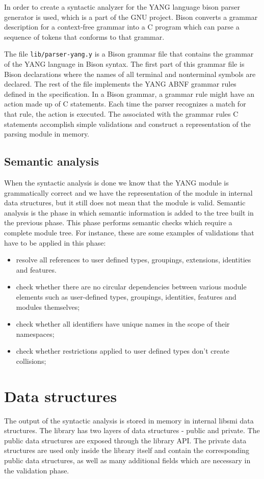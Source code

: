 \documentclass[conference]{IEEEtran}
\begin{document}
In order to create a syntactic analyzer for the YANG language bison parser generator \cite{bib6} is used, which is a part of the GNU project. Bison converts a grammar description for a context-free grammar into a C program which can parse a sequence of tokens that conforms to that grammar. 

The file \texttt{lib/parser-yang.y} is a Bison grammar file that contains the grammar of the YANG language in Bison syntax. The first part of this grammar file is Bison declarations where the names of all terminal and nonterminal symbols are declared. The rest of the file implements the YANG ABNF grammar rules defined in the specification. In a Bison grammar, a grammar rule might have an action made up of C statements. Each time the parser recognizes a match for that rule, the action is executed. The associated with the grammar rules C statements accomplish simple validations and construct a representation of the parsing module in memory.

\subsection{Semantic analysis}
When the syntactic analysis is done we know that the YANG module is grammatically correct and we have the representation of the module in internal data structures, but it still does not mean that the  module is valid. Semantic analysis is the phase in which semantic information is added to the tree built in the previous phase. This phase performs semantic checks which require a complete module tree. For instance, these are some examples of validations that have to be applied in this phase:
\begin{itemize}
\item resolve all references to user defined types, groupings, extensions, identities and features.
\item check whether there are no circular dependencies between various module elements such as user-defined types, groupings, identities, features and modules themselves;
\item check whether all identifiers have unique names in the scope of their namespaces;
\item check whether restrictions applied to user defined types don't create collisions;
\end{itemize}

\section{Data structures}
The output of the syntactic analysis is stored in memory in internal libsmi data structures. The library has two layers of data structures - public and private. The public data structures are exposed through the library API. The private data structures are used only inside the library itself and contain the corresponding public data structures, as well as many additional fields which are necessary in the validation phase. 
\end{document}
